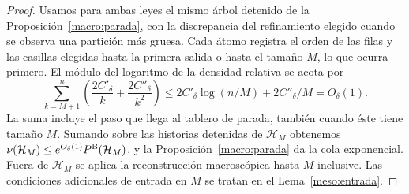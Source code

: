 \begin{proof}
Usamos para ambas leyes el mismo árbol detenido de la Proposición~\ref{macro:parada}, con la
discrepancia del refinamiento elegido cuando se observa una partición más gruesa. Cada átomo registra
el orden de las filas y las casillas elegidas hasta la primera salida o hasta el tamaño $M$, lo que
ocurra primero. El módulo del logaritmo de la densidad relativa se acota por
\[
 \sum_{k=M+1}^{n}\left(\frac{2C'_\delta}{k}+\frac{2C''_\delta}{k^2}\right)
 \le 2C'_\delta\log(n/M)+2C''_\delta/M=O_\delta(1).
\]
La suma incluye el paso que llega al tablero de parada, también cuando éste tiene tamaño $M$.
Sumando sobre las historias detenidas de $\mathcal H_M$ obtenemos
$\nu(\mathcal H_M)\le e^{O_\delta(1)}P^{\rm B}(\mathcal H_M)$, y la Proposición~\ref{macro:parada}
da la cola exponencial. Fuera de $\mathcal H_M$ se aplica la reconstrucción macroscópica hasta $M$
inclusive. Las condiciones adicionales de entrada en $M$ se tratan en el Lema~\ref{meso:entrada}.
\end{proof}
